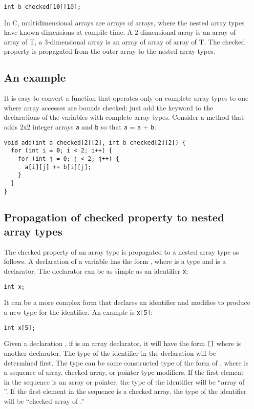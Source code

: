\begin{lstlisting}
int b checked[10][10];
\end{lstlisting}

In C, multidimensional arrays are arrays of arrays,
where the nested array types have known dimensions at compile-time. A
2-dimensional array is an array of array of T, a 3-dimensional array is
an array of array of array of T. The checked property is propagated from the
outer array to the nested array types.

\subsection{An example}

It is easy to convert a function that operates only on complete array
types to one where array accesses are bounds checked: just add the
 keyword to the declarations of the variables with complete array
types. Consider a method that adds 2x2 integer arrays \lstinline+a+ and
\lstinline+b+ so that \lstinline+a+ = \lstinline+a+ + \lstinline+b+:

\begin{lstlisting}
void add(int a checked[2][2], int b checked[2][2]) {
  for (int i = 0; i < 2; i++) {
    for (int j = 0; j < 2; j++) {
      a[i][j] += b[i][j];
    }
  }
}
\end{lstlisting}

\subsection{Propagation of checked property to nested array types}
The checked property of an array type is propagated to a nested array type as follows.
A declaration of a variable has the form  ,
where  is a type and  is a declarator. The declarator
can be as simple as an identifier \lstinline+x+:
\begin{lstlisting}
int x;
\end{lstlisting}
It can be a more complex form that declares an identifier and modifies 
to produce a new type for the identifier. An example is \lstinline+x[5]+:
\begin{lstlisting}
int x[5];
\end{lstlisting}

Given a declaration  , if  is an array
declarator, it will have the form
\lstinline|[|\lstinline|]|
where  is another declarator. The type of the identifier in the
declaration  will be determined first. The type can be some
constructed type of the form  of , where
 is a sequence of array, checked array, or pointer
type modifiers. If the first element in the 
sequence is an array or pointer, the type of the identifier will be
 ``array of  ''. If the first element in the
 sequence is a checked array, the type of the
identifier will be  ``checked array of .''

